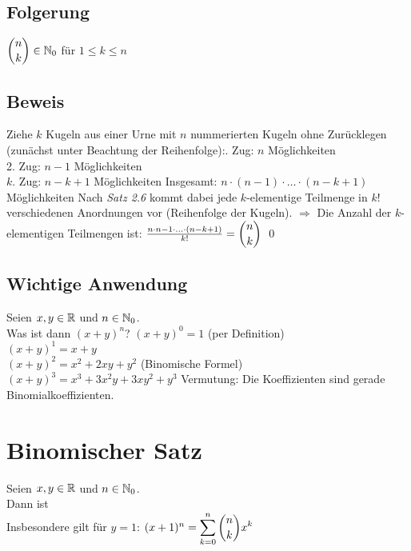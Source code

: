 \fancyhead[R]{}

\subsection*{Folgerung}
$\displaystyle\binom{n}{k} \in \mathbb{N}_0$ für $1 \le k \le n$

\subsection*{Beweis}
Ziehe $k$ Kugeln aus einer Urne mit $n$ nummerierten Kugeln ohne Zurücklegen (zunächst unter Beachtung der Reihenfolge):. Zug: $n$ Möglichkeiten\\
2. Zug: $n-1$ Möglichkeiten\\
$k$. Zug: $n-k+1$ Möglichkeiten\nl
Insgesamt: $n \cdot (n-1) \cdot \hdots \cdot (n-k+1)$ Möglichkeiten\nl
Nach \emph{Satz 2.6} kommt dabei jede $k$-elementige Teilmenge in $k!$ verschiedenen Anordnungen vor (Reihenfolge der Kugeln).\nl
$\Rightarrow$ Die Anzahl der $k$-elementigen Teilmengen ist: $\frac{n \cdot {n-1} \cdot \hdots \cdot (n-k+1)}{k!} = \displaystyle\binom{n}{k}$ \qed

\subsection*{Wichtige Anwendung}\label{binFormel}
Seien $x,y \in \mathbb{R}$ und $n \in \mathbb{N}_0$.\\
Was ist dann $(x+y)^n$?\nl
$(x+y)^0=1$ (per Definition)\\
$(x+y)^1=x+y$\\
$(x+y)^2=x^2+2xy+y^2$ (Binomische Formel)\\
$(x+y)^3=x^3+3x^2y+3xy^2+y^3$\nl
Vermutung: Die Koeffizienten sind gerade Binomialkoeffizienten.

\newpage

\section{Binomischer Satz}\label{2.10}
Seien $x,y \in \mathbb{R}$ und $n \in \mathbb{N}_0$.\\
Dann ist \\
Insbesondere gilt für $y=1$: $(x+1)^n = \displaystyle\sum_{k=0}^n \displaystyle\binom{n}{k} x^k$

